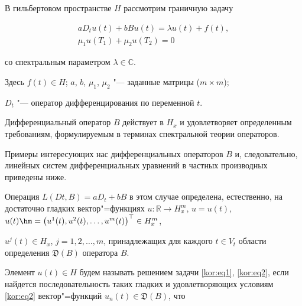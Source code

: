 




\smallskip




В гильбертовом пространстве $H$ рассмотрим граничную задачу

\begin{gather}

\label{kor:eq1}

aD_t u(t) + bBu(t) = \lambda u(t) + f(t),

\\

\label{kor:eq2}

\mu_1 u(T_1)+\mu_2 u(T_2)=0

\end{gather}

со спектральным параметром $\lambda\in\mathbb{C}$. 

Здесь $f(t)\in H$; $a$, $b$, $\mu_1$, $\mu_2$ "--- заданные матрицы ($m\times m$); 

$D_{t}$ "--- оператор дифференцирования по переменной $t$. 



Дифференциальный оператор $B$ действует в $H_x$ и удовлетворяет определенным требованиям, формулируемым в терминах спектральной теории операторов. 

Примеры интересующих нас дифференциальных операторов $B$ и, следовательно, линейных систем дифференциальных уравнений в частных производных приведены ниже. 



Операция $L(Dt, B)=aD_t+bB$ в этом случае определена, естественно, на достаточно гладких вектор"=функциях $u:\mathbb{R}\to H_x^m$, $u=u(t)$, $u(t)\hm=\bigl(u^1(t), u^2(t),\dots,u^m(t)\bigr)^\top\in H_x^m$, 

$u^j(t)\in H_x$, $j=1, 2,\ldots,m$, принадлежащих для каждого $t\in V_t$ области определения $\mathfrak{D}(B)$ оператора $B$. 



Элемент $u(t)\in H$ будем называть решением задачи \eqref{kor:eq1}, \eqref{kor:eq2}, если найдется последовательность таких гладких и удовлетворяющих условиям \eqref{kor:eq2} вектор"=функций $u_n(t)\in\mathfrak{D}(B)$, что 

